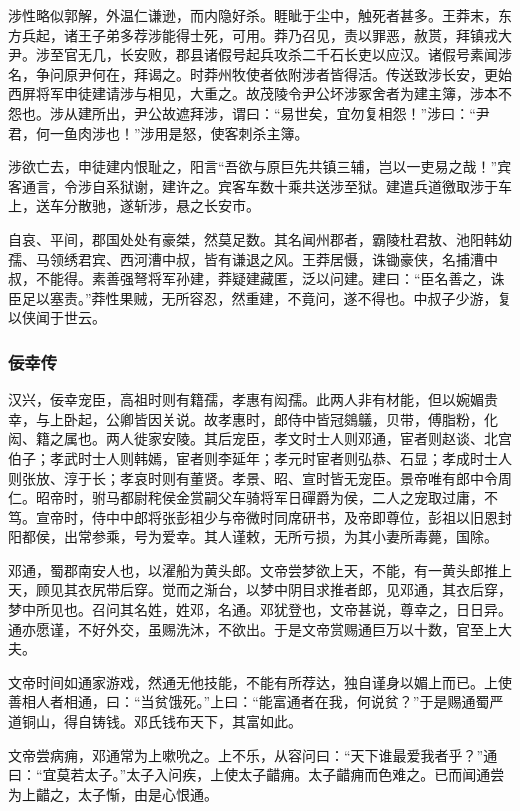 \documentclass[]{article}
\begin{document}
涉性略似郭解，外温仁谦逊，而内隐好杀。睚眦于尘中，触死者甚多。王莽末，东方兵起，诸王子弟多荐涉能得士死，可用。莽乃召见，责以罪恶，赦贳，拜镇戎大尹。涉至官无几，长安败，郡县诸假号起兵攻杀二千石长吏以应汉。诸假号素闻涉名，争问原尹何在，拜谒之。时莽州牧使者依附涉者皆得活。传送致涉长安，更始西屏将军申徒建请涉与相见，大重之。故茂陵令尹公坏涉冢舍者为建主簿，涉本不怨也。涉从建所出，尹公故遮拜涉，谓曰：``易世矣，宜勿复相怨！''涉曰：``尹君，何一鱼肉涉也！''涉用是怒，使客刺杀主簿。

涉欲亡去，申徒建内恨耻之，阳言``吾欲与原巨先共镇三辅，岂以一吏易之哉！''宾客通言，令涉自系狱谢，建许之。宾客车数十乘共送涉至狱。建遣兵道徼取涉于车上，送车分散驰，遂斩涉，悬之长安市。

自哀、平间，郡国处处有豪桀，然莫足数。其名闻州郡者，霸陵杜君敖、池阳韩幼孺、马领绣君宾、西河漕中叔，皆有谦退之风。王莽居慑，诛锄豪侠，名捕漕中叔，不能得。素善强弩将军孙建，莽疑建藏匿，泛以问建。建曰：``臣名善之，诛臣足以塞责。''莽性果贼，无所容忍，然重建，不竟问，遂不得也。中叔子少游，复以侠闻于世云。

\hypertarget{header-n6130}{%
\subsubsection{佞幸传}\label{header-n6130}}

汉兴，佞幸宠臣，高祖时则有籍孺，孝惠有闳孺。此两人非有材能，但以婉媚贵幸，与上卧起，公卿皆因关说。故孝惠时，郎侍中皆冠鵕鸃，贝带，傅脂粉，化闳、籍之属也。两人徙家安陵。其后宠臣，孝文时士人则邓通，宦者则赵谈、北宫伯子；孝武时士人则韩嫣，宦者则李延年；孝元时宦者则弘恭、石显；孝成时士人则张放、淳于长；孝哀时则有董贤。孝景、昭、宣时皆无宠臣。景帝唯有郎中令周仁。昭帝时，驸马都尉秺侯金赏嗣父车骑将军日磾爵为侯，二人之宠取过庸，不笃。宣帝时，侍中中郎将张彭祖少与帝微时同席研书，及帝即尊位，彭祖以旧恩封阳都侯，出常参乘，号为爱幸。其人谨敕，无所亏损，为其小妻所毒薨，国除。

邓通，蜀郡南安人也，以濯船为黄头郎。文帝尝梦欲上天，不能，有一黄头郎推上天，顾见其衣尻带后穿。觉而之渐台，以梦中阴目求推者郎，见邓通，其衣后穿，梦中所见也。召问其名姓，姓邓，名通。邓犹登也，文帝甚说，尊幸之，日日异。通亦愿谨，不好外交，虽赐洗沐，不欲出。于是文帝赏赐通巨万以十数，官至上大夫。

文帝时间如通家游戏，然通无他技能，不能有所荐达，独自谨身以媚上而已。上使善相人者相通，曰：``当贫饿死。''上曰：``能富通者在我，何说贫？''于是赐通蜀严道铜山，得自铸钱。邓氏钱布天下，其富如此。

文帝尝病痈，邓通常为上嗽吮之。上不乐，从容问曰：``天下谁最爱我者乎？''通曰：``宜莫若太子。''太子入问疾，上使太子齰痈。太子齰痈而色难之。已而闻通尝为上齰之，太子惭，由是心恨通。
\end{document}
